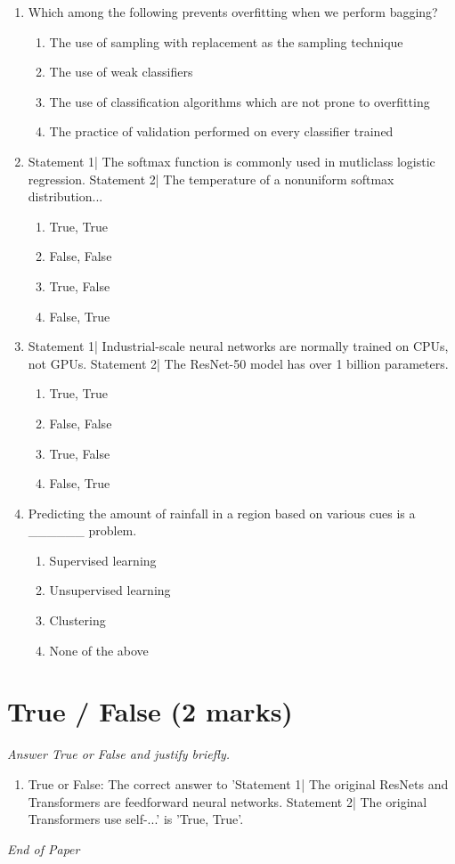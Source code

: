 \documentclass[{\csname fa0013Font0\endcsname\char"0030}{\csname fa0014Font0\endcsname\char"0033}pt]{article}
\begin{document}
\begin{enumerate}[label=\arabic*.]
\begin{enumerate}[label=(\alph*)]
    \item Naive Bayesian
\end{enumerate}
\item Which among the following prevents overfitting when we perform bagging?
\begin{enumerate}[label=(\alph*)]
    \item The use of sampling with replacement as the sampling technique
    \item The use of weak classifiers
    \item The use of classification algorithms which are not prone to overfitting
    \item The practice of validation performed on every classifier trained
\end{enumerate}
\item Statement 1| The softmax function is commonly used in mutliclass logistic regression. Statement 2| The temperature of a nonuniform softmax distribution...
\begin{enumerate}[label=(\alph*)]
    \item True, True
    \item False, False
    \item True, False
    \item False, True
\end{enumerate}
\item Statement 1| Industrial-scale neural networks are normally trained on CPUs, not GPUs. Statement 2| The ResNet-50 model has over 1 billion parameters.
\begin{enumerate}[label=(\alph*)]
    \item True, True
    \item False, False
    \item True, False
    \item False, True
\end{enumerate}
\item Predicting the amount of rainfall in a region based on various cues is a \_\_\_\_\_\_ problem.
\begin{enumerate}[label=(\alph*)]
    \item Supervised learning
    \item Unsupervised learning
    \item Clustering
    \item None of the above
\end{enumerate}
\end{enumerate}

\section*{True / False (2 marks)}
\textit{Answer True or False and justify briefly.}
\begin{enumerate}[label=\arabic*.]
\item True or False: The correct answer to 'Statement 1| The original ResNets and Transformers are feedforward neural networks. Statement 2| The original Transformers use self-...' is 'True, True'.
\end{enumerate}

\vfill
\noindent\textit{End of Paper}
\end{document}
